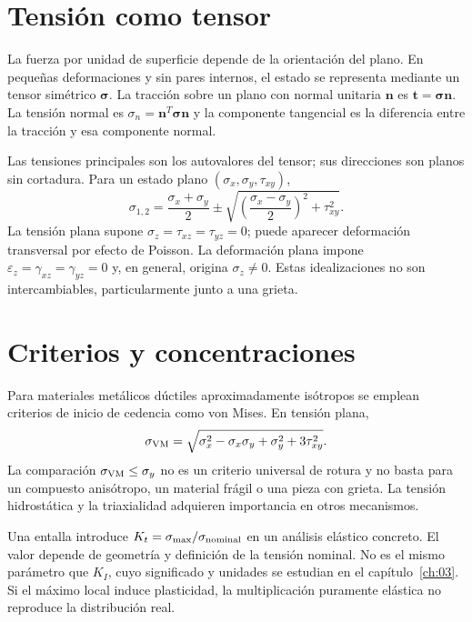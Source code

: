 \section{Tensión como tensor}
La fuerza por unidad de superficie depende de la orientación del plano. En pequeñas deformaciones y sin pares internos, el estado se representa mediante un tensor simétrico $\boldsymbol\sigma$. La tracción sobre un plano con normal unitaria $\mathbf n$ es $\mathbf t=\boldsymbol\sigma\mathbf n$. La tensión normal es $\sigma_n=\mathbf n^T\boldsymbol\sigma\mathbf n$ y la componente tangencial es la diferencia entre la tracción y esa componente normal.

Las tensiones principales son los autovalores del tensor; sus direcciones son planos sin cortadura. Para un estado plano $(\sigma_x,\sigma_y,\tau_{xy})$,
\begin{equation}\sigma_{1,2}=\frac{\sigma_x+\sigma_y}{2}\pm\sqrt{\left(\frac{\sigma_x-\sigma_y}{2}\right)^2+\tau_{xy}^2}.\label{eq:principales}\end{equation}
La tensión plana supone $\sigma_z=\tau_{xz}=\tau_{yz}=0$; puede aparecer deformación transversal por efecto de Poisson. La deformación plana impone $\varepsilon_z=\gamma_{xz}=\gamma_{yz}=0$ y, en general, origina $\sigma_z\ne0$. Estas idealizaciones no son intercambiables, particularmente junto a una grieta.
\section{Criterios y concentraciones}
Para materiales metálicos dúctiles aproximadamente isótropos se emplean criterios de inicio de cedencia como von Mises. En tensión plana,
\begin{equation}\sigma_{\rm VM}=\sqrt{\sigma_x^2-\sigma_x\sigma_y+\sigma_y^2+3\tau_{xy}^2}.\label{eq:mises}\end{equation}
La comparación $\sigma_{\rm VM}\leq\sigma_y$ no es un criterio universal de rotura y no basta para un compuesto anisótropo, un material frágil o una pieza con grieta. La tensión hidrostática y la triaxialidad adquieren importancia en otros mecanismos.

Una entalla introduce $K_t=\sigma_{\max}/\sigma_{\rm nominal}$ en un análisis elástico concreto. El valor depende de geometría y definición de la tensión nominal. No es el mismo parámetro que $K_I$, cuyo significado y unidades se estudian en el capítulo~\ref{ch:03}. Si el máximo local induce plasticidad, la multiplicación puramente elástica no reproduce la distribución real.
